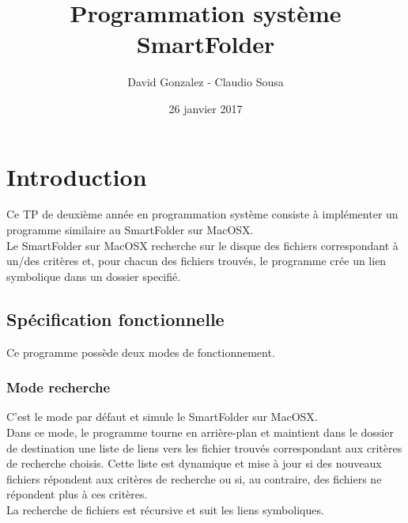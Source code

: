\documentclass[11pt, a4paper]{article}
\begin{document}
\title
{
    \Huge{Programmation système} \\
    \Huge{SmartFolder}
}
\author
{
    \LARGE{David Gonzalez - Claudio Sousa}
}
\date{26 janvier 2017}
\maketitle

\begin{center}
\end{center}

\thispagestyle{empty}

\newpage

\section{Introduction}

Ce TP de deuxième année en programmation système consiste à implémenter un programme similaire au SmartFolder sur MacOSX. \\

Le SmartFolder sur MacOSX recherche sur le disque des fichiers correspondant à un/des critères et,
pour chacun des fichiers trouvés, le programme crée un lien symbolique dans un dossier specifié.

\subsection{Spécification fonctionnelle}
Ce programme possède deux modes de fonctionnement.

\subsubsection{Mode recherche}
C'est le mode par défaut et simule le SmartFolder sur MacOSX. \\

Dans ce mode, le programme tourne en arrière-plan et maintient dans le dossier de destination une liste de liens vers les fichier trouvés correspondant aux critères de recherche choisis.
Cette liste est dynamique et mise à jour si des nouveaux fichiers répondent aux critères de recherche ou si, au contraire, des fichiers ne répondent plus à ces critères. \\

La recherche de fichiers est récursive et suit les liens symboliques.
\end{document}
